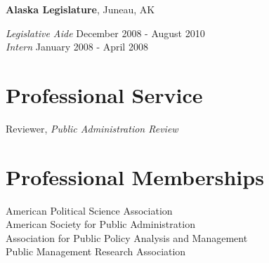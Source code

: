 \documentclass[margin,line]{res}
\begin{document}
\begin{resume}
{\bf Alaska Legislature}, Juneau, AK

\vspace{-.3cm}
{\em Legislative Aide} \hfill  December 2008 - August 2010\\
{\em Intern} \hfill January 2008 - April 2008

\section{\sc Professional Service}
Reviewer, {\em Public Administration Review} \\

\section{\sc Professional Memberships}
American Political Science Association \\
American Society for Public Administration \\
Association for Public Policy Analysis and Management \\
Public Management Research Association

\end{resume}
\end{document}
